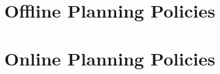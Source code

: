 \documentclass[letterpaper, 12pt, leqno]{report}
\begin{document}







\chapter{Offline Planning Policies}

\chapter{Online Planning Policies}




\end{document}
